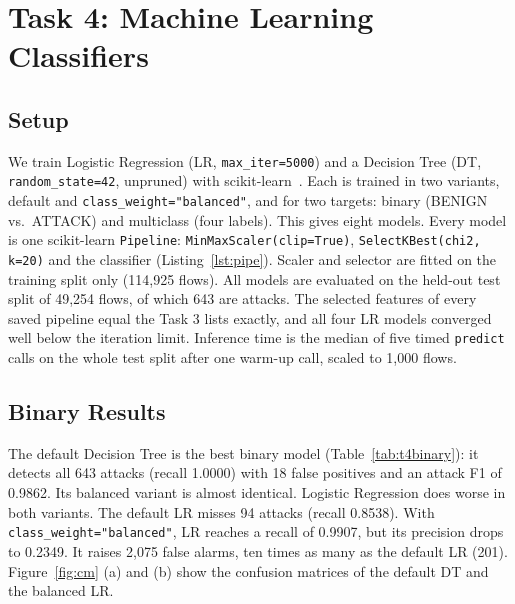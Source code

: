 \chapter{Task 4: Machine Learning Classifiers}\label{chap:task4_ml}

\section{Setup}\label{sec:ml-setup}

We train Logistic Regression (LR, \texttt{max\_iter=5000}) and a Decision Tree (DT, \texttt{random\_state=42}, unpruned) with scikit-learn~\cite{pedregosa2011sklearn}. Each is trained in two variants, default and \texttt{class\_weight="balanced"}, and for two targets: binary (BENIGN vs.\ ATTACK) and multiclass (four labels). This gives eight models. Every model is one scikit-learn \texttt{Pipeline}: \texttt{MinMaxScaler(clip=True)}, \texttt{SelectKBest(chi2, k=20)} and the classifier (Listing~\ref{lst:pipe}). Scaler and selector are fitted on the training split only (114,925 flows). All models are evaluated on the held-out test split of 49,254 flows, of which 643 are attacks. The selected features of every saved pipeline equal the Task 3 lists exactly, and all four LR models converged well below the iteration limit. Inference time is the median of five timed \texttt{predict} calls on the whole test split after one warm-up call, scaled to 1,000 flows.



\section{Binary Results}\label{sec:ml-binary}

The default Decision Tree is the best binary model (Table~\ref{tab:t4binary}): it detects all 643 attacks (recall 1.0000) with 18 false positives and an attack F1 of 0.9862. Its balanced variant is almost identical. Logistic Regression does worse in both variants. The default LR misses 94 attacks (recall 0.8538). With \texttt{class\_weight="balanced"}, LR reaches a recall of 0.9907, but its precision drops to 0.2349. It raises 2,075 false alarms, ten times as many as the default LR (201). Figure~\ref{fig:cm} (a) and (b) show the confusion matrices of the default DT and the balanced LR.

